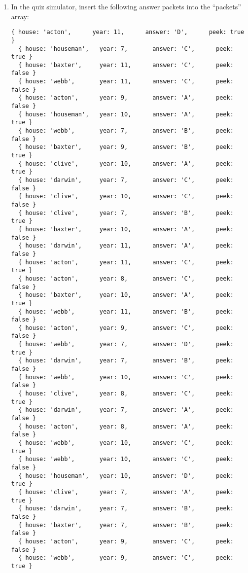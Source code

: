 \begin{enumerate}
  \item In the quiz simulator, insert the following answer packets into the ``packets'' array:
  \begin{Verbatim}[fontsize=\small]
  { house: 'acton',      year: 11,      answer: 'D',      peek: true }
  { house: 'houseman',   year: 7,       answer: 'C',      peek: true }
  { house: 'baxter',     year: 11,      answer: 'C',      peek: false }
  { house: 'webb',       year: 11,      answer: 'C',      peek: false }
  { house: 'acton',      year: 9,       answer: 'A',      peek: false }
  { house: 'houseman',   year: 10,      answer: 'A',      peek: true }
  { house: 'webb',       year: 7,       answer: 'B',      peek: false }
  { house: 'baxter',     year: 9,       answer: 'B',      peek: true }
  { house: 'clive',      year: 10,      answer: 'A',      peek: true }
  { house: 'darwin',     year: 7,       answer: 'C',      peek: false }
  { house: 'clive',      year: 10,      answer: 'C',      peek: false }
  { house: 'clive',      year: 7,       answer: 'B',      peek: true }
  { house: 'baxter',     year: 10,      answer: 'A',      peek: false }
  { house: 'darwin',     year: 11,      answer: 'A',      peek: false }
  { house: 'acton',      year: 11,      answer: 'C',      peek: true }
  { house: 'acton',      year: 8,       answer: 'C',      peek: false }
  { house: 'baxter',     year: 10,      answer: 'A',      peek: true }
  { house: 'webb',       year: 11,      answer: 'B',      peek: false }
  { house: 'acton',      year: 9,       answer: 'C',      peek: false }
  { house: 'webb',       year: 7,       answer: 'D',      peek: true }
  { house: 'darwin',     year: 7,       answer: 'B',      peek: false }
  { house: 'webb',       year: 10,      answer: 'C',      peek: false }
  { house: 'clive',      year: 8,       answer: 'C',      peek: true }
  { house: 'darwin',     year: 7,       answer: 'A',      peek: false }
  { house: 'acton',      year: 8,       answer: 'A',      peek: false }
  { house: 'webb',       year: 10,      answer: 'C',      peek: true }
  { house: 'webb',       year: 10,      answer: 'C',      peek: false }
  { house: 'houseman',   year: 10,      answer: 'D',      peek: true }
  { house: 'clive',      year: 7,       answer: 'A',      peek: true }
  { house: 'darwin',     year: 7,       answer: 'B',      peek: false }
  { house: 'baxter',     year: 7,       answer: 'B',      peek: false }
  { house: 'acton',      year: 9,       answer: 'C',      peek: false }
  { house: 'webb',       year: 9,       answer: 'C',      peek: true }

\end{Verbatim}
\end{enumerate}
